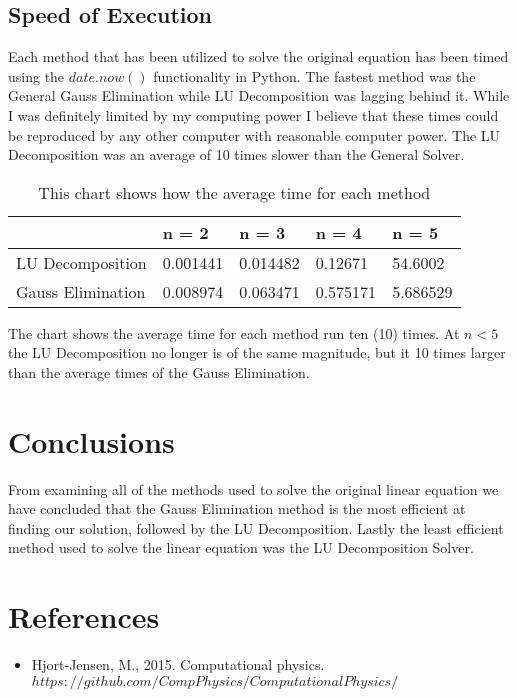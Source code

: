 \documentclass[12pt]{article}
\begin{document}
\subsection{Speed of Execution}
Each method that has been utilized to solve the original equation has been timed using the $date.now()$ functionality in Python. The fastest method was the General Gauss Elimination while LU Decomposition was lagging behind it. While I was definitely limited by my computing power I believe that these times could be reproduced by any other computer with reasonable computer power. The LU Decomposition was an average of 10 times slower than the General Solver.\\
\begin{table}[H]
	\centering
	\bigskip
	\bigskip
	\bigskip
	
	\begin{tabular}{l|l|l|l|l|}
		& n = 2    & n = 3    & n = 4    & n = 5    \\ \hline
		LU Decomposition  & 0.001441 & 0.014482 & 0.12671  & 54.6002  \\ \hline
		Gauss Elimination & 0.008974 & 0.063471 & 0.575171 & 5.686529 \\ \hline
	\end{tabular}
	\caption{This chart shows how the average time for each method}
\end{table}
The chart shows the average time for each method run ten (10) times. At $n < 5$ the LU Decomposition no longer is of the same magnitude, but it 10 times larger than the average times of the Gauss Elimination. 
\pagebreak
\section{Conclusions}
From examining all of the methods used to solve the original linear equation we have concluded that the Gauss Elimination method is the most efficient at finding our solution, followed by the LU Decomposition. Lastly the least efficient method used to solve the linear equation was the LU Decomposition Solver.
\section{References}
\begin{itemize}
	\item  Hjort-Jensen, M., 2015. Computational physics. \\$https://github.com/CompPhysics/ComputationalPhysics/$
\end{itemize}
\end{document}
